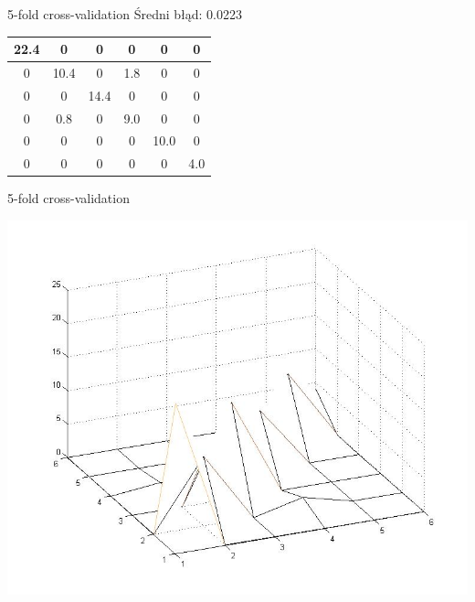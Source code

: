 \documentclass{beamer}
\begin{document}
\begin{frame}{5-fold cross-validation}
 Średni błąd: 0.0223
\vspace{0.5cm}

\begin{center}
{\LARGE 
\begin{tabular}{ | c | c | c | c | c | c |}
\hline
   22.4  &       0  &       0  &       0 &        0  &       0 \\ \hline
         0  & 10.4  &       0  &  1.8 &        0  &       0 \\ \hline
         0  &       0  & 14.4  &       0 &        0  &       0 \\ \hline
         0  &  0.8  &       0  &  9.0 &        0  &       0 \\ \hline
         0  &       0  &       0  &       0 &  10.0  &       0 \\ \hline
         0  &       0  &       0  &       0 &        0  &  4.0 \\ \hline
\end{tabular}
}
\end{center}
\end{frame}

\begin{frame}{5-fold cross-validation}
\begin{center}
  \includegraphics[scale=0.35]{img/mp_mesh.jpg}  
\end{center}
\end{frame}
\end{document}

